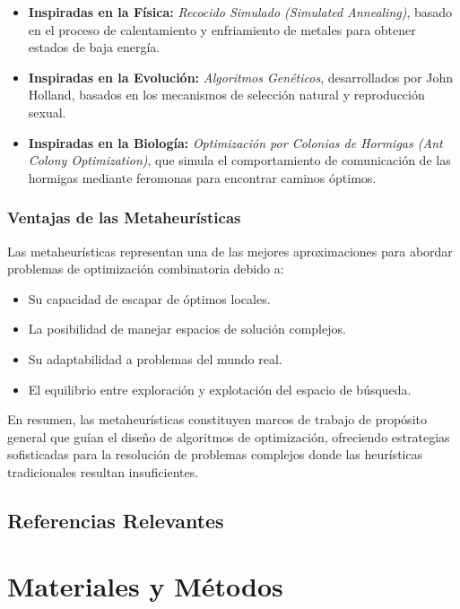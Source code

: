 \documentclass[12pt,titlepage,twoside,openright]{book}
\begin{document}
\begin{itemize}
    \item \textbf{Inspiradas en la Física:} \textit{Recocido Simulado (Simulated Annealing)}, basado en el proceso de calentamiento y enfriamiento de metales para obtener estados de baja energía.
    \item \textbf{Inspiradas en la Evolución:} \textit{Algoritmos Genéticos}, desarrollados por John Holland, basados en los mecanismos de selección natural y reproducción sexual.
    \item \textbf{Inspiradas en la Biología:} \textit{Optimización por Colonias de Hormigas (Ant Colony Optimization)}, que simula el comportamiento de comunicación de las hormigas mediante feromonas para encontrar caminos óptimos.
\end{itemize}

\subsection*{Ventajas de las Metaheurísticas}

Las metaheurísticas representan una de las mejores aproximaciones para abordar problemas de optimización combinatoria debido a:

\begin{itemize}
    \item Su capacidad de escapar de óptimos locales.
    \item La posibilidad de manejar espacios de solución complejos.
    \item Su adaptabilidad a problemas del mundo real.
    \item El equilibrio entre exploración y explotación del espacio de búsqueda.
\end{itemize}

En resumen, las metaheurísticas constituyen marcos de trabajo de propósito general que guían el diseño de algoritmos de optimización, ofreciendo estrategias sofisticadas para la resolución de problemas complejos donde las heurísticas tradicionales resultan insuficientes.


\section{Referencias Relevantes}

\chapter{Materiales y Métodos}
\label{cap:materialesymetodos}
\end{document}
